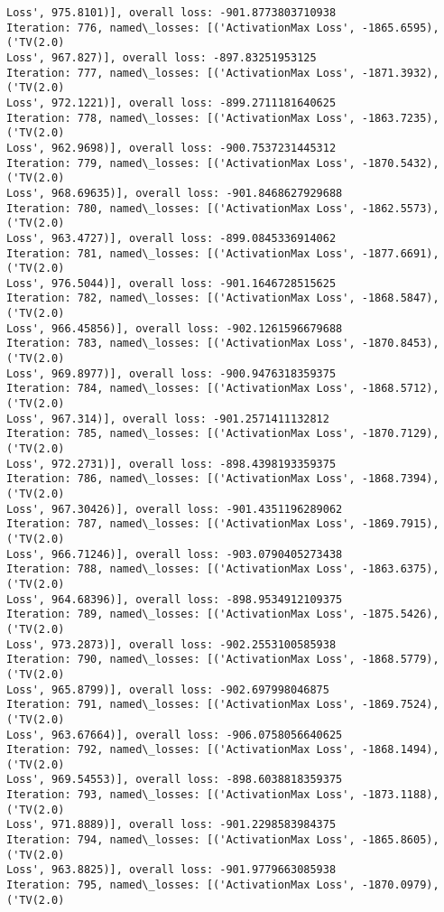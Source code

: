 \documentclass[10pt]{article}
\begin{document}
\begin{Verbatim}[commandchars=\\\{\}]
Loss', 975.8101)], overall loss: -901.8773803710938
Iteration: 776, named\_losses: [('ActivationMax Loss', -1865.6595), ('TV(2.0)
Loss', 967.827)], overall loss: -897.83251953125
Iteration: 777, named\_losses: [('ActivationMax Loss', -1871.3932), ('TV(2.0)
Loss', 972.1221)], overall loss: -899.2711181640625
Iteration: 778, named\_losses: [('ActivationMax Loss', -1863.7235), ('TV(2.0)
Loss', 962.9698)], overall loss: -900.7537231445312
Iteration: 779, named\_losses: [('ActivationMax Loss', -1870.5432), ('TV(2.0)
Loss', 968.69635)], overall loss: -901.8468627929688
Iteration: 780, named\_losses: [('ActivationMax Loss', -1862.5573), ('TV(2.0)
Loss', 963.4727)], overall loss: -899.0845336914062
Iteration: 781, named\_losses: [('ActivationMax Loss', -1877.6691), ('TV(2.0)
Loss', 976.5044)], overall loss: -901.1646728515625
Iteration: 782, named\_losses: [('ActivationMax Loss', -1868.5847), ('TV(2.0)
Loss', 966.45856)], overall loss: -902.1261596679688
Iteration: 783, named\_losses: [('ActivationMax Loss', -1870.8453), ('TV(2.0)
Loss', 969.8977)], overall loss: -900.9476318359375
Iteration: 784, named\_losses: [('ActivationMax Loss', -1868.5712), ('TV(2.0)
Loss', 967.314)], overall loss: -901.2571411132812
Iteration: 785, named\_losses: [('ActivationMax Loss', -1870.7129), ('TV(2.0)
Loss', 972.2731)], overall loss: -898.4398193359375
Iteration: 786, named\_losses: [('ActivationMax Loss', -1868.7394), ('TV(2.0)
Loss', 967.30426)], overall loss: -901.4351196289062
Iteration: 787, named\_losses: [('ActivationMax Loss', -1869.7915), ('TV(2.0)
Loss', 966.71246)], overall loss: -903.0790405273438
Iteration: 788, named\_losses: [('ActivationMax Loss', -1863.6375), ('TV(2.0)
Loss', 964.68396)], overall loss: -898.9534912109375
Iteration: 789, named\_losses: [('ActivationMax Loss', -1875.5426), ('TV(2.0)
Loss', 973.2873)], overall loss: -902.2553100585938
Iteration: 790, named\_losses: [('ActivationMax Loss', -1868.5779), ('TV(2.0)
Loss', 965.8799)], overall loss: -902.697998046875
Iteration: 791, named\_losses: [('ActivationMax Loss', -1869.7524), ('TV(2.0)
Loss', 963.67664)], overall loss: -906.0758056640625
Iteration: 792, named\_losses: [('ActivationMax Loss', -1868.1494), ('TV(2.0)
Loss', 969.54553)], overall loss: -898.6038818359375
Iteration: 793, named\_losses: [('ActivationMax Loss', -1873.1188), ('TV(2.0)
Loss', 971.8889)], overall loss: -901.2298583984375
Iteration: 794, named\_losses: [('ActivationMax Loss', -1865.8605), ('TV(2.0)
Loss', 963.8825)], overall loss: -901.9779663085938
Iteration: 795, named\_losses: [('ActivationMax Loss', -1870.0979), ('TV(2.0)

\end{Verbatim}
\end{document}
